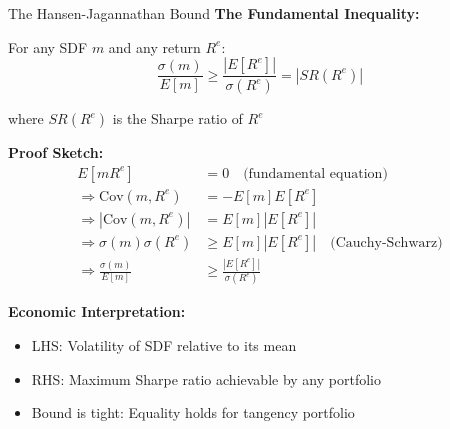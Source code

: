 \documentclass{beamer}
\begin{document}
\begin{frame}{The Hansen-Jagannathan Bound}
    \textbf{The Fundamental Inequality:}
    
    For any SDF $m$ and any return $R^e$:
    \begin{equation}\label{eq:hj_bound}
        \frac{\sigma(m)}{E[m]} \geq \frac{|E[R^e]|}{\sigma(R^e)} = |SR(R^e)|
    \end{equation}
    
    where $SR(R^e)$ is the Sharpe ratio of $R^e$
    
    \vspace{0.3cm}
    \textbf{Proof Sketch:}
    \begin{equation*}
        \begin{aligned}
            E[m R^e] &= 0 \quad \text{(fundamental equation)} \\
            \Rightarrow \text{Cov}(m, R^e) &= -E[m] E[R^e] \\
            \Rightarrow |\text{Cov}(m, R^e)| &= E[m] |E[R^e]| \\
            \Rightarrow \sigma(m) \sigma(R^e) &\geq E[m] |E[R^e]| \quad \text{(Cauchy-Schwarz)} \\
            \Rightarrow \frac{\sigma(m)}{E[m]} &\geq \frac{|E[R^e]|}{\sigma(R^e)}
        \end{aligned}
    \end{equation*}
    
    
    \textbf{Economic Interpretation:}
    \begin{itemize}
        \item LHS: Volatility of SDF relative to its mean
        \item RHS: Maximum Sharpe ratio achievable by any portfolio
        \item Bound is tight: Equality holds for tangency portfolio
    \end{itemize}
\end{frame}
\end{document}
